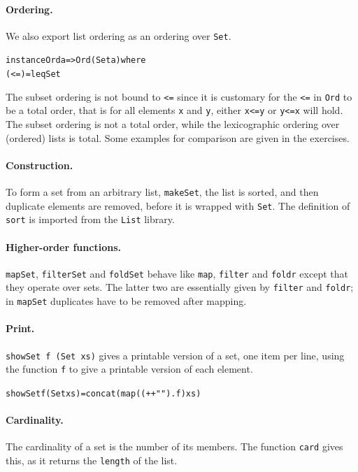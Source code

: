 \paragraph{Ordering.}
We also export list ordering as an ordering over \texttt{Set}.
\begin{alltt}
instance Ord a => Ord (Set a) where
  (<=) = leqSet
\end{alltt}
The subset ordering is not bound to \texttt{<=} since it is customary
for the \texttt{<=} in \texttt{Ord} to be a total order, that is for all elements
\texttt{x} and \texttt{y}, either \texttt{x<=y} or \texttt{y<=x} will hold. 
The subset ordering is
not a total order, while the lexicographic ordering over (ordered)
lists is total. Some examples for comparison are given in the exercises.

\paragraph{Construction.}
To form a set from an arbitrary list, \texttt{makeSet}, the list is sorted, and
then duplicate elements are removed, before it is wrapped with \texttt{Set}. 
The definition of \texttt{sort} is
imported from the \texttt{List} library.

\paragraph{Higher-order functions.}
\texttt{mapSet}, \texttt{filterSet} and \texttt{foldSet}
behave like \texttt{map}, \texttt{filter} and \texttt{foldr}
except that they operate over sets. The latter two are essentially given by \texttt{filter}
and \texttt{foldr}; in \texttt{mapSet} duplicates have to be removed after mapping.

\paragraph{Print.}
\texttt{showSet f (Set xs)} gives a printable version of a set, one item per line,
using the function \texttt{f} to give a printable version of each element.
\begin{alltt}
showSet f (Set xs) = concat (map ((++"") . f) xs)
\end{alltt}
\paragraph{Cardinality.}
The cardinality of a set is the number of its members. The function \texttt{card}
gives this, as it returns the \texttt{length} of the list.
 

